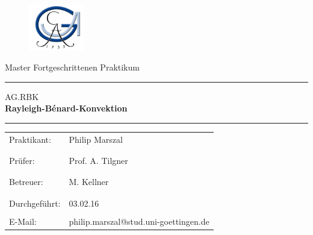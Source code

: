 \documentclass[a4paper, 12pt, ngerman]{article}
\begin{document}
 \begin{titlepage}
 \begin{figure}[t]
 \includegraphics[height=2cm]{georg} \hfill
 \end{figure}

\normalsize
\vspace{1cm}

\begin{center}
\Large Master Fortgeschrittenen Praktikum \\ \vspace{1cm}
\hrule \vspace{3mm}
\large {AG.RBK} \\
\Huge{\bf Rayleigh-B\'enard-Konvektion}
\vspace{5mm}
\hrule
\end{center}

\normalsize


\begin{table}[!h]
\begin{center}

  \begin{tabular}{ll}
  Praktikant: &Philip Marszal\\
   &\\
   &\\
  Prüfer: & Prof. A. Tilgner\\
	&\\
	&\\
  Betreuer: & M. Kellner\\
  &\\
  &\\
	  Durchgeführt: & 03.02.16\\

\vspace{1cm}& \\
  E-Mail: & \ttfamily philip.marszal@stud.uni-goettingen.de\\
\end{tabular}
\end{center}
\end{table}
\end{titlepage}
\newpage
\thispagestyle{empty}
\mbox{}
\thispagestyle{empty}
\newpage
\thispagestyle{empty}
\tableofcontents
\newpage

\pagestyle{fancy}
\setcounter{page}{1}
\end{document}
